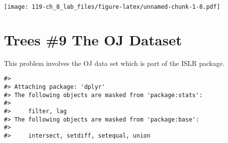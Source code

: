 \documentclass[
]{book}
\newenvironment{Shaded}{\begin{snugshade}}{\end{snugshade}}
\newcommand{\AttributeTok}[1]{\textcolor[rgb]{0.77,0.63,0.00}{#1}}
\newcommand{\CommentTok}[1]{\textcolor[rgb]{0.56,0.35,0.01}{\textit{#1}}}
\newcommand{\DecValTok}[1]{\textcolor[rgb]{0.00,0.00,0.81}{#1}}
\newcommand{\DocumentationTok}[1]{\textcolor[rgb]{0.56,0.35,0.01}{\textbf{\textit{#1}}}}
\newcommand{\FunctionTok}[1]{\textcolor[rgb]{0.00,0.00,0.00}{#1}}
\newcommand{\NormalTok}[1]{#1}
\newcommand{\OtherTok}[1]{\textcolor[rgb]{0.56,0.35,0.01}{#1}}
\newcommand{\SpecialCharTok}[1]{\textcolor[rgb]{0.00,0.00,0.00}{#1}}
\begin{document}
\begin{Shaded}
\end{Shaded}

\texttt{[image: 119-ch\_8\_lab\_files/figure-latex/unnamed-chunk-1-8.pdf]}

\hypertarget{trees-9-the-oj-dataset}{%
\chapter{Trees \#9 The OJ Dataset}\label{trees-9-the-oj-dataset}}

This problem involves the OJ data set which is part of the ISLR package.

\begin{verbatim}
#> 
#> Attaching package: 'dplyr'
#> The following objects are masked from 'package:stats':
#> 
#>     filter, lag
#> The following objects are masked from 'package:base':
#> 
#>     intersect, setdiff, setequal, union
\end{verbatim}
\end{document}
